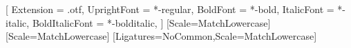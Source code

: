 \usepackage[english]{babel}

\usepackage{amsmath,amssymb,amsfonts}
\usepackage[utf8]{inputenc}

\usepackage{fontspec}
\usepackage{unicode-math}
\setmainfont{texgyretermes}[
  Extension = .otf,
  UprightFont = *-regular,
  BoldFont = *-bold,
  ItalicFont = *-italic,
  BoldItalicFont = *-bolditalic,
]
[Scale=MatchLowercase]
\setsansfont{TeX Gyre Heros}[Scale=MatchLowercase]
\setmonofont{TeX Gyre Cursor}[Ligatures=NoCommon,Scale=MatchLowercase]

\usepackage{lastpage}

\usepackage{gensymb}

\usepackage{setspace}

\usepackage{ccicons}

\usepackage[hang,flushmargin]{footmisc}

\usepackage{geometry}

\setlength{\parindent}{0pt}
\setlength{\parskip}{6pt plus 2pt minus 1pt}

\usepackage{fancyhdr}
\renewcommand{\headrulewidth}{0pt}